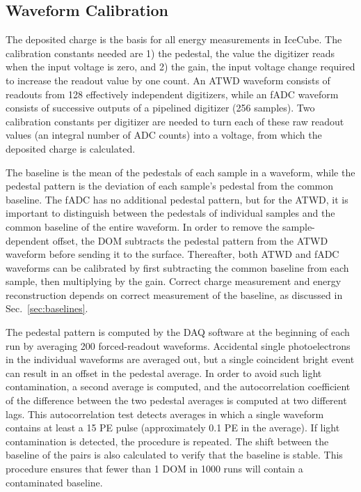 \subsection{\label{sec:waveformcal}Waveform Calibration}

The deposited charge is the basis for all energy measurements in IceCube. The
calibration constants needed are 1) the pedestal, the value the digitizer
reads when the input voltage is zero, and 2) the gain, the input voltage change
required to increase the readout value by one count.  An ATWD waveform
consists of readouts from 128 effectively independent 
digitizers, while an fADC waveform consists of successive outputs of a 
pipelined digitizer (256 samples). Two calibration constants per digitizer are needed to turn each of these
raw readout values (an integral number of ADC counts) into a
voltage, from which the deposited charge is calculated.

The baseline is the mean of the pedestals of each sample in a waveform, while the pedestal pattern is
the deviation of each sample's pedestal from the common baseline.  The fADC
has no additional pedestal pattern, but for the ATWD, it is important to distinguish
between the pedestals of individual samples 
and the common baseline of the entire waveform.  In order to remove the
sample-dependent offset, the DOM subtracts the pedestal pattern from
the ATWD waveform before sending it to the surface.  Thereafter, both ATWD
and fADC waveforms can be calibrated by first subtracting the common
baseline from each sample, then multiplying by the gain. Correct charge
measurement and energy reconstruction depends on correct measurement
of the baseline, as discussed in Sec.~\ref{sec:baselines}.

The pedestal pattern is computed by the DAQ software at the beginning of each 
run by averaging 200 forced-readout waveforms.  Accidental single photoelectrons in
the individual waveforms are averaged out, but a single coincident bright event can
result in an offset in the pedestal average.  In order to avoid such
light contamination, a second average is computed, and the
autocorrelation coefficient of the difference between the two pedestal
averages is computed at two different lags.  This autocorrelation test detects averages in which a
single waveform contains at least a 15 PE pulse (approximately 0.1 PE in the
average).  If light contamination is detected, the procedure is repeated.
The shift between the baseline of the pairs is also calculated to verify
that the baseline is stable.  This procedure ensures that fewer than 1 DOM
in 1000 runs will contain a contaminated baseline.

